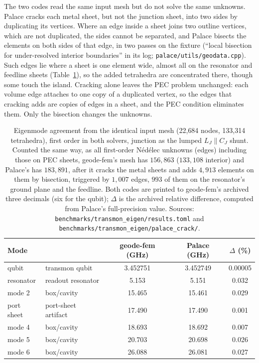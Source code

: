 \documentclass{anvil-paper}
\begin{document}
The two codes read the same input mesh but do not solve the same unknowns.
Palace cracks each metal sheet, but not the junction sheet, into two sides
by duplicating its vertices. Where an edge inside a sheet joins two outline
vertices, which are not duplicated, the sides cannot be separated, and
Palace bisects the elements on both sides of that edge, in two passes on
the fixture (``local bisection
for under-resolved interior boundaries'' in its log;
\texttt{palace/utils/geodata.cpp}). Such edges lie where a sheet is one
element wide, almost all on the resonator and feedline sheets
(Table~\ref{tab:agreement}), so the added tetrahedra are concentrated
there, though some touch the island. Cracking alone leaves the PEC problem unchanged: each
volume edge attaches to one copy of a duplicated vertex, so the edges that
cracking adds are copies of edges in a sheet, and the PEC condition
eliminates them. Only the bisection changes the unknowns.

\begin{table}[htbp]
  \centering
  \caption{Eigenmode agreement from the identical input mesh (22{,}684
  nodes, 133{,}314 tetrahedra), first order in both solvers, junction as
  the lumped $L_J \parallel C_J$ shunt. Counted the same way, as all
  first-order N\'ed\'elec unknowns (edges) including those on PEC sheets,
  geode-fem's mesh has $156{,}863$ ($133{,}108$ interior) and Palace's has
  $183{,}891$, after it cracks the metal sheets and adds $4{,}913$ elements
  on them by bisection, triggered by $1{,}007$ edges, $993$ of them on
  the resonator's ground plane and the feedline. Both
  codes are printed to geode-fem's archived three decimals (six for the
  qubit); $\Delta$ is the archived relative difference, computed from
  Palace's full-precision value. Sources:
  \texttt{benchmarks/transmon\_eigen/results.toml} and
  \texttt{benchmarks/transmon\_eigen/palace\_crack/}.}
  \label{tab:agreement}
  \footnotesize
  \begin{tabular}{@{}llccc@{}}
    \toprule
    Mode & & geode-fem (GHz) & Palace (GHz) & $\Delta$ (\%) \\
    \midrule
    qubit & transmon qubit & 3.452751 & 3.452749 & 0.00005 \\
    resonator & readout resonator & 5.153 & 5.151 & 0.032 \\
    mode 2 & box/cavity & 15.465 & 15.461 & 0.029 \\
    port sheet & port-sheet artifact & 17.490 & 17.490 & 0.001 \\
    mode 4 & box/cavity & 18.693 & 18.692 & 0.007 \\
    mode 5 & box/cavity & 20.703 & 20.698 & 0.026 \\
    mode 6 & box/cavity & 26.088 & 26.081 & 0.027 \\
    \bottomrule
  \end{tabular}
\end{table}
\end{document}
